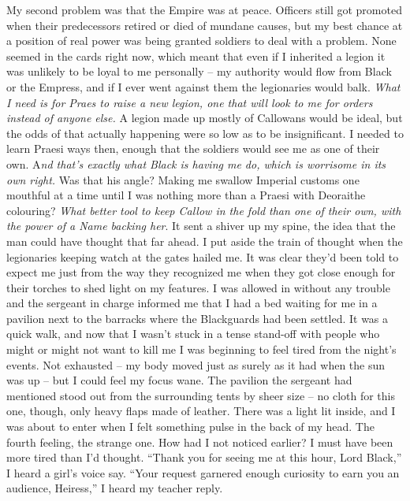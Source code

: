 \documentclass[12pt, openany]{book}
\begin{document}
My second problem was that the Empire was at peace. Officers still got promoted when their predecessors retired or died of mundane causes, but my best chance at a position of real power was being granted soldiers to deal with a problem. None seemed in the cards right now, which meant that even if I inherited a legion it was unlikely to be loyal to me personally – my authority would flow from Black or the Empress, and if I ever went against them the legionaries would balk. \textit{What I need is for Praes to raise a new legion, one that will look to me for orders instead of anyone else.} A legion made up mostly of Callowans would be ideal, but the odds of that actually happening were so low as to be insignificant. I needed to learn Praesi ways then, enough that the soldiers would see me as one of their own. A\textit{nd that’s exactly what Black is having me do, which is worrisome in its own right.} Was that his angle? Making me swallow Imperial customs one mouthful at a time until I was nothing more than a Praesi with Deoraithe colouring? \textit{What better tool to keep Callow in the fold than one of their own, with the power of a Name backing her}. It sent a shiver up my spine, the idea that the man could have thought that far ahead.
I put aside the train of thought when the legionaries keeping watch at the gates hailed me. It was clear they’d been told to expect me just from the way they recognized me when they got close enough for their torches to shed light on my features. I was allowed in without any trouble and the sergeant in charge informed me that I had a bed waiting for me in a pavilion next to the barracks where the Blackguards had been settled. It was a quick walk, and now that I wasn’t stuck in a tense stand-off with people who might or might not want to kill me I was beginning to feel tired from the night’s events. Not exhausted – my body moved just as surely as it had when the sun was up – but I could feel my focus wane. The pavilion the sergeant had mentioned stood out from the surrounding tents by sheer size – no cloth for this one, though, only heavy flaps made of leather. There was a light lit inside, and I was about to enter when I felt something pulse in the back of my head. The fourth feeling, the strange one. How had I not noticed earlier? I must have been more tired than I’d thought.
“Thank you for seeing me at this hour, Lord Black,” I heard a girl’s voice say.
“Your request garnered enough curiosity to earn you an audience, Heiress,” I heard my teacher reply.
\end{document}
